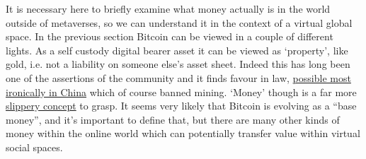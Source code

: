 It is necessary here to briefly examine what money actually is in the world outside of metaverses, so we can understand it in the context of a virtual global space. In the previous section Bitcoin can be viewed in a couple of different lights. As a self custody digital bearer asset it can be viewed as `property', like gold, i.e. not a liability on someone else's asset sheet. Indeed this has long been one of the assertions of the community and it finds favour in law, \href{https://www.regulationasia.com/shanghai-court-says-bitcoin-is-protected-by-law-as-virtual-property/}{possible most ironically in China} which of course banned mining. `Money' though is a far more \href{https://www.bankofengland.co.uk/knowledgebank/what-is-money}{slippery concept} to grasp. It seems very likely that Bitcoin is evolving as a ``base money'', and it's important to define that, but there are many other kinds of money within the online world which can potentially transfer value within virtual social spaces.

